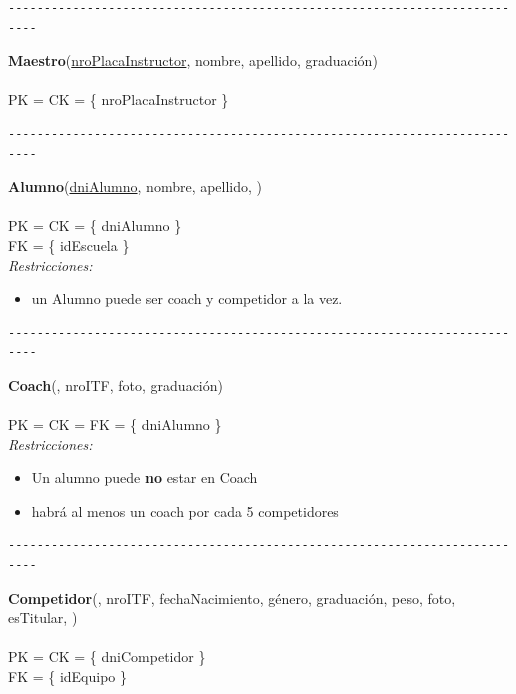 \begin{verbatim}
--------------------------------------------------------------------------
\end{verbatim}

\noindent\textbf{Maestro}(\uline{nroPlacaInstructor}, nombre, apellido, graduación)
\\
\\
PK = CK = \{ nroPlacaInstructor \} \\


\begin{verbatim}
--------------------------------------------------------------------------
\end{verbatim}

\noindent\textbf{Alumno}(\uline{dniAlumno}, nombre, apellido, )
\\
\\
PK = CK = \{ dniAlumno \} \\
FK = \{ idEscuela \} \\

\textit{Restricciones:}
\begin{itemize}
	\item un Alumno puede ser coach y competidor a la vez.
\end{itemize}

\begin{verbatim}
--------------------------------------------------------------------------
\end{verbatim}

\noindent\textbf{Coach}(, nroITF, foto, graduación)
\\
\\
PK = CK = FK = \{ dniAlumno \} \\

\textit{Restricciones:}
\begin{itemize}
	\item Un alumno puede \textbf{no} estar en Coach
	\item habrá al menos un coach por cada 5 competidores
\end{itemize}


\begin{verbatim}
--------------------------------------------------------------------------
\end{verbatim}

\noindent\textbf{Competidor}(, nroITF, fechaNacimiento, género, graduación, peso, foto, esTitular, )
\\
\\
PK = CK = \{ dniCompetidor \} \\
FK = \{ idEquipo \} \\



